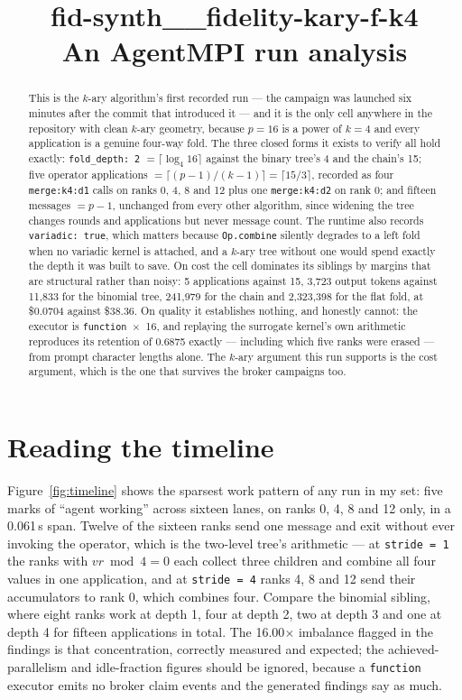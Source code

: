 \documentclass[11pt]{article}
\title{\textbf{fid-synth\_\_fidelity-kary-f-k4}\\[2pt]\large An AgentMPI run analysis}
\author{}
\date{}
\begin{document}
\maketitle

\begin{abstract}
This is the $k$-ary algorithm's first recorded run --- the campaign was launched six minutes
after the commit that introduced it --- and it is the only cell anywhere in the repository
with clean $k$-ary geometry, because $p=16$ is a power of $k=4$ and every application is a
genuine four-way fold. The three closed forms it exists to verify all hold exactly:
\texttt{fold\_depth: 2} $= \lceil\log_4 16\rceil$ against the binary tree's 4 and the
chain's 15; five operator applications $= \lceil (p-1)/(k-1)\rceil = \lceil 15/3\rceil$,
recorded as four \texttt{merge:k4:d1} calls on ranks 0, 4, 8 and 12 plus one
\texttt{merge:k4:d2} on rank 0; and fifteen messages $= p-1$, unchanged from every other
algorithm, since widening the tree changes rounds and applications but never message count.
The runtime also records \texttt{variadic: true}, which matters because \texttt{Op.combine}
silently degrades to a left fold when no variadic kernel is attached, and a $k$-ary tree
without one would spend exactly the depth it was built to save. On cost the cell dominates
its siblings by margins that are structural rather than noisy: 5 applications against 15,
3{,}723 output tokens against 11{,}833 for the binomial tree, 241{,}979 for the chain and
2{,}323{,}398 for the flat fold, at \$0.0704 against \$38.36. On quality it establishes
nothing, and honestly cannot: the executor is \texttt{function}~$\times$~16, and replaying
the surrogate kernel's own arithmetic reproduces its retention of 0.6875 exactly ---
including which five ranks were erased --- from prompt character lengths alone. The
$k$-ary argument this run supports is the cost argument, which is the one that survives the
broker campaigns too.
\end{abstract}



\section{Reading the timeline}

Figure~\ref{fig:timeline} shows the sparsest work pattern of any run in my set: five marks
of ``agent working'' across sixteen lanes, on ranks 0, 4, 8 and 12 only, in a 0.061\,s span.
Twelve of the sixteen ranks send one message and exit without ever invoking the operator,
which is the two-level tree's arithmetic --- at \texttt{stride = 1} the ranks with
$vr \bmod 4 = 0$ each collect three children and combine all four values in one
application, and at \texttt{stride = 4} ranks 4, 8 and 12 send their accumulators to rank 0,
which combines four. Compare the binomial sibling, where eight ranks work at depth 1, four
at depth 2, two at depth 3 and one at depth 4 for fifteen applications in total. The
16.00$\times$ imbalance flagged in the findings is that concentration, correctly measured
and expected; the achieved-parallelism and idle-fraction figures should be ignored, because
a \texttt{function} executor emits no broker claim events and the generated findings say as
much.
\end{document}
